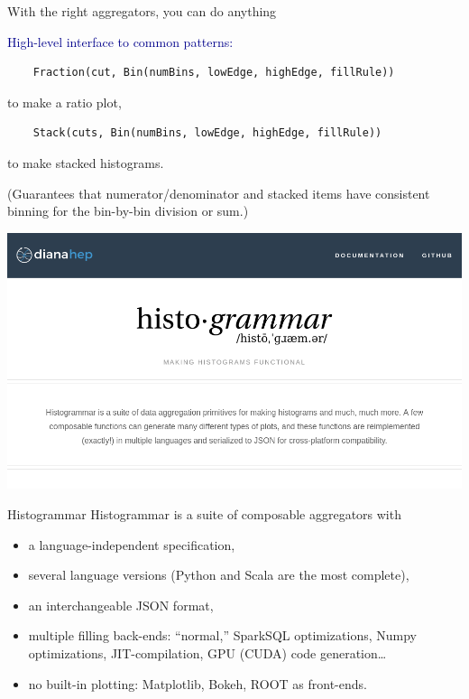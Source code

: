 \documentclass[aspectratio=169]{beamer}
\begin{document}
\begin{frame}[fragile]{With the right aggregators, you can do anything}
\begin{center}
\begin{minipage}{0.9\linewidth}
\small
\textcolor{darkblue}{\normalsize High-level interface to common patterns:}
\begin{verbatim}
    Fraction(cut, Bin(numBins, lowEdge, highEdge, fillRule))
\end{verbatim}

{\normalsize to make a ratio plot,}

\begin{verbatim}
    Stack(cuts, Bin(numBins, lowEdge, highEdge, fillRule))
\end{verbatim}

{\normalsize to make stacked histograms.}

\vspace{0.75 cm}
{\normalsize (Guarantees that numerator/denominator and stacked items have consistent binning for the bin-by-bin division or sum.)}
\end{minipage}
\end{center}
\end{frame}

\begin{frame}{}
\hspace{-1 cm}\mbox{\includegraphics[width=16 cm]{frontpage.png}\hspace{-5 cm}}
\end{frame}

\begin{frame}{Histogrammar}
\large Histogrammar is a suite of composable aggregators with

\vspace{0.3 cm}
\begin{itemize}\setlength{\itemsep}{0.3 cm}
\item<2-> a language-independent specification,
\item<3-> several language versions (Python and Scala are the most complete),
\item<4-> an interchangeable JSON format,
\item<5-> multiple filling back-ends: ``normal,'' SparkSQL optimizations, Numpy optimizations, JIT-compilation, GPU (CUDA) code generation\ldots
\item<6-> no built-in plotting: Matplotlib, Bokeh, ROOT as front-ends.
\end{itemize}
\end{frame}
\end{document}
